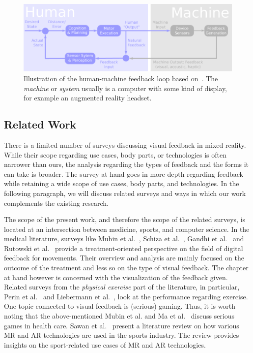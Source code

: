 \begin{figure}[tb]
    \centering
    \includegraphics[width=1\linewidth]{pictures/feedbackloop.pdf}
    \caption{Illustration of the human-machine feedback loop based on~\cite{morone2021dab}\label{fig:feedback}. The \emph{machine} or \emph{system} usually is a computer with some kind of display, for example an augmented reality headset.}
\end{figure}

\subsection{Related Work\label{sec:relatedwork}}
There is a limited number of surveys discussing visual feedback in mixed reality. While their scope regarding use cases, body parts, or technologies is often narrower than ours, the analysis regarding the types of feedback and the forms it can take is broader. The survey at hand goes in more depth regarding feedback while retaining a wide scope of use cases, body parts, and technologies. In the following paragraph, we will discuss related surveys and ways in which our work complements the existing research.

The scope of the present work, and therefore the scope of the related surveys, is located at an intersection between medicine, sports, and computer science. In the medical literature, surveys like Mubin et al.~\cite{mubin2020esg}, Schiza et al.~\cite{schiza2019vra}, Gandhi et al.~\cite{gandhi2020mts} and Rutowski et al.~\cite{rutkowski2020uvr} provide a treatment-oriented perspective on the field of digital feedback for movements. Their overview and analysis are mainly focused on the outcome of the treatment and less so on the type of visual feedback. The chapter at hand however is concerned with the visualization of the feedback given. Related surveys from the \emph{physical exercise} part of the literature, in particular, Perin et al.~\cite{perin2018sas} and Liebermann et al.~\cite{liebermann2002aai}, look at the performance regarding exercise.
One topic connected to visual feedback is (serious) gaming. Thus, it is worth noting that the above-mentioned Mubin et al. \cite{mubin2020esg} and Ma et al.~\cite{ma2011vrp} discuss serious games in health care. Sawan et al.~\cite{Sawan2016MRS} present a literature review on how various MR and AR technologies are used in the sports industry. The review provides insights on the sport-related use cases of MR and AR technologies.

